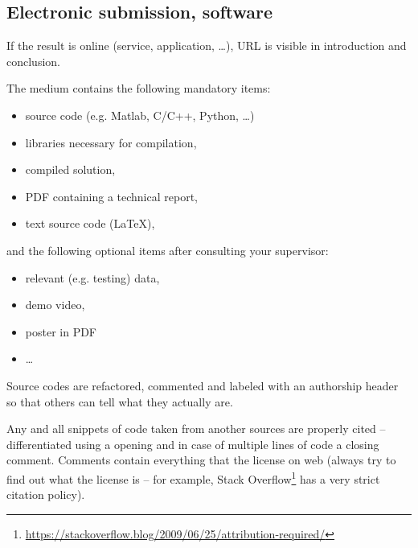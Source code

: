 \subsection*{Electronic submission, software}
\begin{checklist}
	\item If the result is online (service, application, …), URL is visible in introduction and conclusion.
    \item The medium contains the following mandatory items:
    \begin{itemize}
    	\item source code (e.g. Matlab, C/C++, Python, \ldots)
        \item libraries necessary for compilation,
        \item compiled solution,
        \item PDF containing a technical report,
        \item text source code (\LaTeX{}),
    \end{itemize}
    and the following optional items after consulting your supervisor:
    \begin{itemize}
    	\item relevant (e.g. testing) data,
        \item demo video,
        \item poster in PDF
        \item \ldots
    \end{itemize}
    \item Source codes are refactored, commented and labeled with an authorship header so that others can tell what they actually are.
    \item Any and all snippets of code taken from another sources are properly cited -- differentiated using a opening and in case of multiple lines of code a closing comment. Comments contain everything that the license on web (always try to find out what the license is -- for example, Stack Overflow\footnote{\url{https://stackoverflow.blog/2009/06/25/attribution-required/}} has a very strict citation policy).
\end{checklist}

